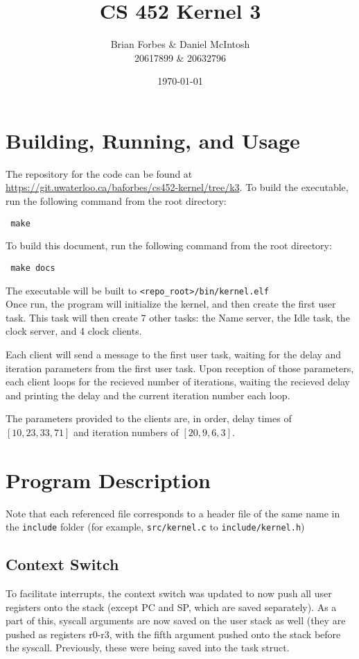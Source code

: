 \documentclass{article}
\begin{document}
\title{CS 452 Kernel 3}
\author{Brian Forbes \& Daniel McIntosh \\ 20617899 \& 20632796}
\date{\today}

\maketitle

\section{Building, Running, and Usage}

The repository for the code can be found at \url{https://git.uwaterloo.ca/baforbes/cs452-kernel/tree/k3}.
To build the executable, run the following command from the root directory: \begin{verbatim} make \end{verbatim}
To build this document, run the following command from the root directory: \begin{verbatim} make docs \end{verbatim}
The executable will be built to \verb|<repo_root>/bin/kernel.elf|\\

Once run, the program will initialize the kernel, and then create the first user task. This task will then create 7 other tasks: the Name server, the Idle task, the clock server, and 4 clock clients.

Each client will send a message to the first user task, waiting for the delay and iteration parameters from the first user task. 
Upon reception of those parameters, each client loops for the recieved number of iterations, waiting the recieved delay and printing the delay and the current iteration number each loop.

The parameters provided to the clients are, in order, delay times of $[10, 23, 33, 71]$ and iteration numbers of $[20, 9, 6, 3]$.

\section{Program Description}
Note that each referenced file corresponds to a header file of the same name in the \verb|include| folder (for example, \verb|src/kernel.c| to \verb|include/kernel.h|)
\subsection{Context Switch}
    To facilitate interrupts, the context switch was updated to now push all user registers onto the stack (except PC and SP, which are saved separately). As a part of this, syscall arguments are now saved on the user stack as well (they are pushed as registers r0-r3, with the fifth argument pushed onto the stack before the syscall. Previously, these were being saved into the task struct.
\end{document}
